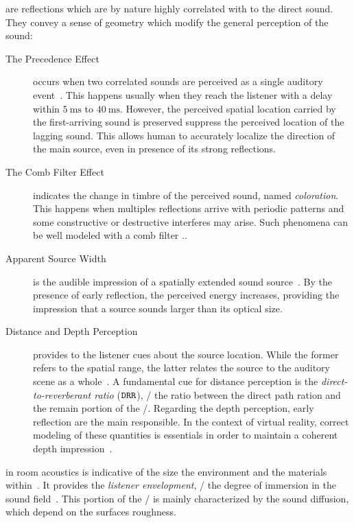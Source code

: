  are reflections which are by nature highly correlated with to the direct sound.
They convey a sense of geometry which modify the general perception of the sound:
\begin{description}
    \item[The Precedence Effect] occurs when two correlated sounds are perceived as a single auditory event~\cite{wallach1973precedence}.
    This happens usually when they reach the listener with a delay within $\SI{5}{\ms}$ to $\SI{40}{\ms}$.
    However, the perceived spatial location carried by the first-arriving sound is preserved suppress the perceived location of the lagging sound.
    This allows human to accurately localize the direction of the main source, even in presence of its strong reflections.
    \item[The Comb Filter Effect] indicates the change in timbre of the perceived sound, named \textit{coloration}.
    This happens when multiples reflections arrive with periodic patterns and some constructive or destructive interferes may arise.
    Such phenomena can be well modeled with a comb filter \cite{barron1971subjective}..
    \item[Apparent Source Width] is the audible impression of a spatially extended sound source~\cite{griesinger1997psychoacoustics}.
    By the presence of early reflection, the perceived energy increases, providing the impression that a source sounds larger than its optical size.
    \item[Distance and Depth Perception] provides to the listener cues about the source location.
    While the former refers to the spatial range, the latter relates the source to the auditory scene as a whole~\cite{kearney2012distance}.
    A fundamental cue for distance perception is the \textit{direct-to-reverberant ratio} ($\mathtt{DRR}$),
    \ie/ the ratio between the direct path ration and the remain portion of the \RIR/.
    Regarding the depth perception, early reflection are the main responsible.
    In the context of virtual reality, correct modeling of these quantities is essentials in order to maintain a coherent depth impression~\cite{kearney2012distance}.
\end{description}

 in room acoustics is indicative of the size the environment and the materials within~\cite{valimaki2016more}.
It provides the \textit{listener envelopment}, \ie/ the degree of immersion in the sound field~\cite{griesinger1997psychoacoustics}.
This portion of the \RIR/ is mainly characterized by the sound diffusion, which depend on the surfaces roughness.

